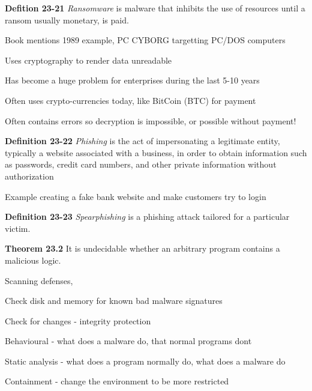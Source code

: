 \documentclass[Screen16to9,17pt]{foils}
\begin{document}


\begin{list1}
\item {\bf Defition 23-21} \emph{Ransomware} is malware that inhibits the use of resources until a ransom usually monetary, is paid.
\item Book mentions 1989 example, PC CYBORG targetting PC/DOS computers
\item Uses cryptography to render data unreadable
\item Has become a huge problem for enterprises during the last 5-10 years
\item Often uses crypto-currencies today, like BitCoin (BTC) for payment
\item Often contains errors so decryption is impossible, or possible without payment!
\end{list1}




\begin{list1}
\item {\bf Definition 23-22} \emph{Phishing} is the act of impersonating a legitimate entity, typically a website associated with a business, in order to obtain information such as passwords, credit card numbers, and other private information without authorization
\item Example creating a fake bank website and make customers try to login
\item {\bf Definition 23-23} \emph{Spearphishing} is a phishing attack tailored for a particular victim.
\end{list1}




\begin{list1}
\item {\bf Theorem 23.2} It is undecidable whether an arbitrary program contains a malicious logic.
\item Scanning defenses,
\begin{list2}
\item Check disk and memory for known bad malware signatures
\item Check for changes - integrity protection
\end{list2}
\item Behavioural - what does a malware do, that normal programs dont
\item Static analysis - what does a program normally do, what does a malware do
\item Containment - change the environment to be more restricted
\end{list1}
\end{document}
